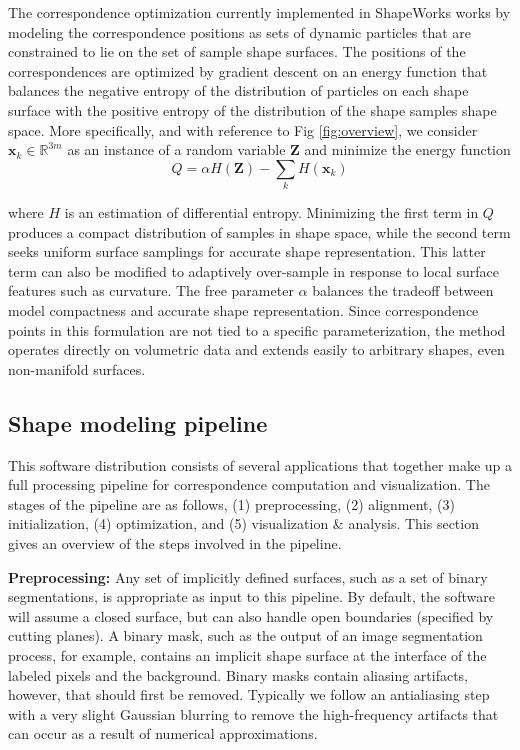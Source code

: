 \documentclass[letterpaper,12pt]{article}   %
\begin{document}
The correspondence optimization currently implemented in ShapeWorks works by modeling the correspondence positions as sets of dynamic particles that are constrained to lie on the set of sample shape surfaces. The positions of the correspondences are optimized by gradient descent on an energy function that balances the negative entropy of the distribution of particles on each shape surface with the positive entropy of the distribution of the shape samples shape space. More specifically, and with reference to Fig \ref{fig:overview}, we consider $\mathbf{x}_k \in \mathbb{R}^{3m}$ as an instance of a random variable $\mathbf{Z}$ and minimize the energy function
\begin{equation}
Q =  \alpha H(\mathbf{Z}) -  \sum_k H(\mathbf{x}_k)
\end{equation}

\noindent where $H$ is an estimation of differential entropy. Minimizing the first term in $Q$ produces a compact distribution of samples in shape space, while the second term seeks uniform surface samplings for accurate shape representation. This latter term can also be modified to adaptively over-sample in response to local surface features such as curvature. The free parameter $\alpha$ balances the tradeoff between model compactness and accurate shape representation. Since correspondence points in this formulation are not tied to a specific parameterization, the method operates directly on volumetric data and extends easily to arbitrary shapes, even non-manifold surfaces.

\subsection{Shape modeling pipeline}

This software distribution consists of several applications that together make up a full processing pipeline for correspondence computation and visualization. The stages of the pipeline are as follows, (1) preprocessing, (2) alignment, (3) initialization, (4) optimization, and (5) visualization \& analysis. This section gives an overview of the steps involved in the pipeline. 

\vspace{0.1in}
\noindent\textbf{Preprocessing:} Any set of implicitly defined surfaces, such as a set of binary segmentations, is appropriate as input to this pipeline. By default, the software will assume a closed surface, but can also handle open boundaries (specified by cutting planes). %
A binary mask, such as the output of an image segmentation process, for example, contains an implicit shape surface at the interface of the labeled pixels and the background. Binary masks contain aliasing artifacts, however, that should first be removed. Typically we follow an antialiasing step with a very slight Gaussian blurring to remove the high-frequency artifacts that can occur as a result of numerical approximations.
\end{document}
